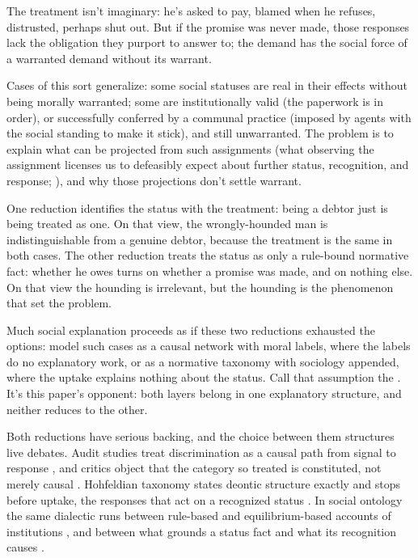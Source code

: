 \documentclass[12pt]{article}
\begin{document}
The treatment isn't imaginary: he's asked to pay, blamed when he refuses, distrusted, perhaps shut out. But if the promise was never made, those responses lack the obligation they purport to answer to; the demand has the social force of a warranted demand without its warrant.

Cases of this sort generalize: some social statuses are real in their effects without being morally warranted; some are institutionally valid (the paperwork is in order), or successfully conferred by a communal practice (imposed by agents with the social standing to make it stick), and still unwarranted. The problem is to explain what can be projected from such assignments (what observing the assignment licenses us to defeasibly expect about further status, recognition, and response; \cite{Goodman1955}), and why those projections don't settle warrant.

One reduction identifies the status with the treatment: being a debtor just is being treated as one. On that view, the wrongly-hounded man is indistinguishable from a genuine debtor, because the treatment is the same in both cases. The other reduction treats the status as only a rule-bound normative fact: whether he owes turns on whether a promise was made, and on nothing else. On that view the hounding is irrelevant, but the hounding is the phenomenon that set the problem.

Much social explanation proceeds as if these two reductions exhausted the options: model such cases as a causal network with moral labels, where the labels do no explanatory work, or as a normative taxonomy with sociology appended, where the uptake explains nothing about the status. Call that assumption the . It's this paper's opponent: both layers belong in one explanatory structure, and neither reduces to the other.

Both reductions have serious backing, and the choice between them structures live debates. Audit studies treat discrimination as a causal path from signal to response \citep{bertrandMullainathan2004EmilyGreg}, and critics object that the category so treated is constituted, not merely causal \citep{kohlerHausmann2019EddieMurphy}. Hohfeldian taxonomy states deontic structure exactly and stops before uptake, the responses that act on a recognized status \citep{hohfeld1913SomeFundamental}. In social ontology the same dialectic runs between rule-based and equilibrium-based accounts of institutions \citep{hindriksGuala2015InstitutionsRulesEquilibria}, and between what grounds a status fact and what its recognition causes \citep{epstein2015AntTrap,asta2018Categories}.
\end{document}
